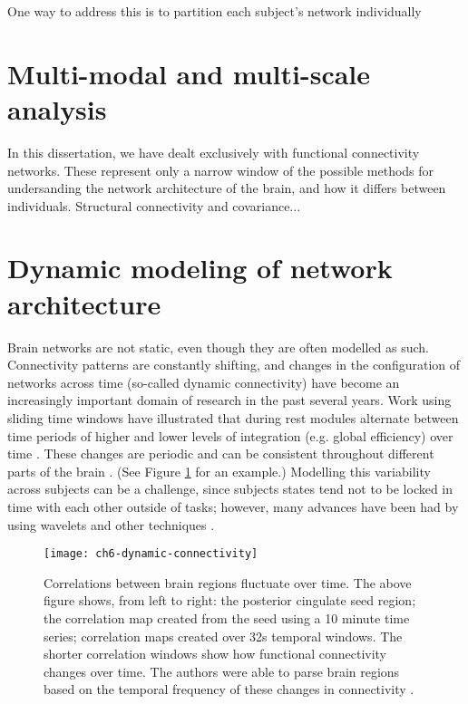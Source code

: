 One way to address this is to partition each subject's network individually

\section{Multi-modal and multi-scale analysis}

In this dissertation, we have dealt exclusively with functional connectivity networks. These represent only a narrow window of the possible methods for undersanding the network architecture of the brain, and how it differs between individuals. Structural connectivity and covariance... 




\section{Dynamic modeling of network architecture}

Brain networks are not static, even though they are often modelled as such. Connectivity patterns are constantly shifting, and changes in the configuration of networks across time (so-called dynamic connectivity) have become an increasingly important domain of research in the past several years. Work using sliding time windows have illustrated that during rest modules alternate between time periods of higher and lower levels of integration (e.g. global efficiency) over time \citep{Zalesky2014}. These changes are periodic and can be consistent throughout different parts of the brain \citep{Handwerker2012}. (See Figure \ref{fig:ch6-dynamic-connectivity} for an example.) Modelling this variability across subjects can be a challenge, since subjects states tend not to be locked in time with each other outside of tasks; however, many advances have been had by using wavelets and other techniques \citep{...}. 

\begin{figure}[t]
	\centering
	\texttt{[image: ch6-dynamic-connectivity]}
	\caption[Correlations between brain regions fluctuate over time.]{Correlations between brain regions fluctuate over time. The above figure shows, from left to right: the posterior cingulate seed region; the correlation map created from the seed using a 10 minute time series; correlation maps created over 32s temporal windows. The shorter correlation windows show how functional connectivity changes over time. The authors were able to parse brain regions based on the temporal frequency of these changes in connectivity \citep{Handwerker2012}.}
	\label{fig:ch6-dynamic-connectivity}
\end{figure}

